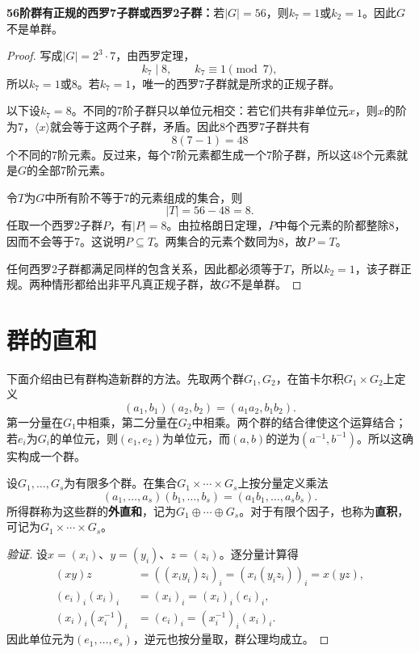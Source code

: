 \begin{example}
\textbf{56阶群有正规的西罗7子群或西罗2子群：}若$|G|=56$，则$k_7=1$或$k_2=1$。因此$G$不是单群。
\end{example}
\begin{proof}
写成$|G|=2^3\cdot7$，由西罗定理，
\[
k_7\mid8,\qquad k_7\equiv1\pmod7,
\]
所以$k_7=1$或$8$。若$k_7=1$，唯一的西罗7子群就是所求的正规子群。

以下设$k_7=8$。不同的7阶子群只以单位元相交：若它们共有非单位元$x$，则$x$的阶为7，$\langle x\rangle$就会等于这两个子群，矛盾。因此8个西罗7子群共有
\[
8(7-1)=48
\]
个不同的7阶元素。反过来，每个7阶元素都生成一个7阶子群，所以这48个元素就是$G$的全部7阶元素。

令$T$为$G$中所有阶不等于7的元素组成的集合，则
\[
|T|=56-48=8.
\]
任取一个西罗2子群$P$，有$|P|=8$。由拉格朗日定理，$P$中每个元素的阶都整除8，因而不会等于7。这说明$P\subseteq T$。两集合的元素个数同为8，故$P=T$。

任何西罗2子群都满足同样的包含关系，因此都必须等于$T$，所以$k_2=1$，该子群正规。两种情形都给出非平凡真正规子群，故$G$不是单群。
\end{proof}



\section{群的直和}

下面介绍由已有群构造新群的方法。先取两个群$G_1,G_2$，在笛卡尔积$G_1\times G_2$上定义
\[
(a_1,b_1)(a_2,b_2)=(a_1a_2,b_1b_2).
\]
第一分量在$G_1$中相乘，第二分量在$G_2$中相乘。两个群的结合律使这个运算结合；若$e_i$为$G_i$的单位元，则$(e_1,e_2)$为单位元，而$(a,b)$的逆为$(a^{-1},b^{-1})$。所以这确实构成一个群。

\begin{definition}
\label{p2:concept:c2-l1501}设$G_1,\ldots,G_s$为有限多个群。在集合$G_1\times\cdots\times G_s$上按分量定义乘法
\[
(a_1,\ldots,a_s)(b_1,\ldots,b_s)=(a_1b_1,\ldots,a_sb_s).
\]
\label{p2:concept:c2-l1505}所得群称为这些群的\textbf{外直和}，记为$G_1\oplus\cdots\oplus G_s$。对于有限个因子，也称为\textbf{直积}，可记为$G_1\times\cdots\times G_s$。
\end{definition}
\begin{proof}[验证]
设$x=(x_i)$、$y=(y_i)$、$z=(z_i)$。逐分量计算得
\begin{align*}
(xy)z&=((x_iy_i)z_i)_i=(x_i(y_iz_i))_i=x(yz),\\
(e_i)_i(x_i)_i&=(x_i)_i=(x_i)_i(e_i)_i,\\
(x_i)_i(x_i^{-1})_i&=(e_i)_i=(x_i^{-1})_i(x_i)_i.
\end{align*}
因此单位元为$(e_1,\ldots,e_s)$，逆元也按分量取，群公理均成立。
\end{proof}

